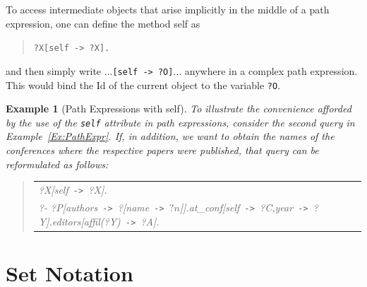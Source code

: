 \documentclass[11pt]{article}
\newtheorem{example}{Example}[section]
\newenvironment{qrules}{\begin{quote}\tt\begin{tabular}[t]{l}}%
{\end{tabular}\end{quote}}
\newcommand{\mvd}{{\mbox{\tt \,->\,}}}  %
\newcommand{\anon}{?}
\begin{document}
To access intermediate objects that arise implicitly in the middle
of a path expression, one can define the method \textsf{self} as
\begin{quote}
  {\tt ?X[self{\mvd}?X].} 
\end{quote}
and then simply write $\dots${\tt [self{\mvd}?O]}$\dots$ anywhere in a
complex path expression. This would bind the Id of the current object to
the variable {\tt ?O}.

\begin{example}[Path Expressions with \textsf{self}]\label{ex-path-self}
  \rm{
    To illustrate the convenience afforded by the use of the {\tt self}
    attribute in path expressions, consider the second query in
    Example~\ref{Ex:PathExpr}. If, in addition, we want to obtain the names
    of the conferences where the respective papers were published, that
    query can be reformulated as follows:
    }
  \begin{qrules}
    \hspace*{-12mm}
    ?X[self\mvd ?X].\\
    \hspace*{-12mm}
    ?- ?P[authors\mvd\anon[name\mvd $?n$]].at\_conf[self\mvd ?C,year\mvd ?Y].editors[affil(?Y)\mvd ?A]. 
  \end{qrules}
\end{example}


\section{Set Notation} \label{sec-sets}
\end{document}
